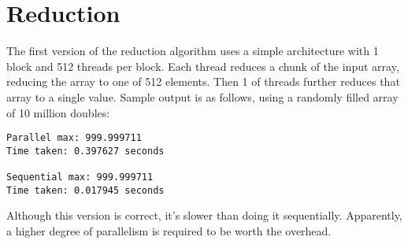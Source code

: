 \documentclass[a4paper]{article}
\begin{document}
\section*{Reduction}
The first version of the reduction algorithm uses a simple architecture with 1
block and 512 threads per block. Each thread reduces a chunk of the input array,
reducing the array to one of 512 elements. Then 1 of threads further reduces
that array to a single value.
Sample output is as follows, using a randomly filled array of 10 million
doubles:
\begin{verbatim}
Parallel max: 999.999711
Time taken: 0.397627 seconds

Sequential max: 999.999711
Time taken: 0.017945 seconds
\end{verbatim}
Although this version is correct, it's slower than doing it sequentially.
Apparently, a higher degree of parallelism is required to be worth the overhead.
\end{document}
